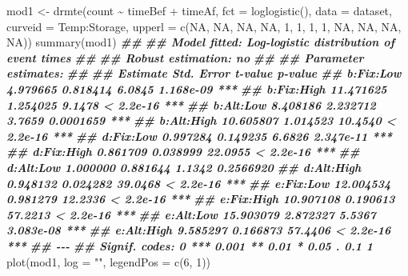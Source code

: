 \documentclass[
]{book}
\newenvironment{Shaded}{\begin{snugshade}}{\end{snugshade}}
\newcommand{\AttributeTok}[1]{\textcolor[rgb]{0.77,0.63,0.00}{#1}}
\newcommand{\ConstantTok}[1]{\textcolor[rgb]{0.00,0.00,0.00}{#1}}
\newcommand{\DecValTok}[1]{\textcolor[rgb]{0.00,0.00,0.81}{#1}}
\newcommand{\DocumentationTok}[1]{\textcolor[rgb]{0.56,0.35,0.01}{\textbf{\textit{#1}}}}
\newcommand{\FunctionTok}[1]{\textcolor[rgb]{0.00,0.00,0.00}{#1}}
\newcommand{\NormalTok}[1]{#1}
\newcommand{\OtherTok}[1]{\textcolor[rgb]{0.56,0.35,0.01}{#1}}
\newcommand{\SpecialCharTok}[1]{\textcolor[rgb]{0.00,0.00,0.00}{#1}}
\newcommand{\StringTok}[1]{\textcolor[rgb]{0.31,0.60,0.02}{#1}}
\begin{document}
\begin{Shaded}
\begin{Highlighting}[]
\NormalTok{mod1 }\OtherTok{\textless{}{-}} \FunctionTok{drmte}\NormalTok{(count }\SpecialCharTok{\textasciitilde{}}\NormalTok{ timeBef }\SpecialCharTok{+}\NormalTok{ timeAf, }\AttributeTok{fct =} \FunctionTok{loglogistic}\NormalTok{(),}
            \AttributeTok{data =}\NormalTok{ dataset, }
            \AttributeTok{curveid =}\NormalTok{ Temp}\SpecialCharTok{:}\NormalTok{Storage,}
            \AttributeTok{upperl =} \FunctionTok{c}\NormalTok{(}\ConstantTok{NA}\NormalTok{, }\ConstantTok{NA}\NormalTok{, }\ConstantTok{NA}\NormalTok{, }\ConstantTok{NA}\NormalTok{, }\DecValTok{1}\NormalTok{, }\DecValTok{1}\NormalTok{, }\DecValTok{1}\NormalTok{, }\DecValTok{1}\NormalTok{, }\ConstantTok{NA}\NormalTok{, }\ConstantTok{NA}\NormalTok{, }\ConstantTok{NA}\NormalTok{, }\ConstantTok{NA}\NormalTok{))}
\FunctionTok{summary}\NormalTok{(mod1)}
\DocumentationTok{\#\# }
\DocumentationTok{\#\# Model fitted: Log{-}logistic distribution of event times}
\DocumentationTok{\#\# }
\DocumentationTok{\#\# Robust estimation: no }
\DocumentationTok{\#\# }
\DocumentationTok{\#\# Parameter estimates:}
\DocumentationTok{\#\# }
\DocumentationTok{\#\#             Estimate Std. Error t{-}value   p{-}value    }
\DocumentationTok{\#\# b:Fix:Low   4.979665   0.818414  6.0845 1.168e{-}09 ***}
\DocumentationTok{\#\# b:Fix:High 11.471625   1.254025  9.1478 \textless{} 2.2e{-}16 ***}
\DocumentationTok{\#\# b:Alt:Low   8.408186   2.232712  3.7659 0.0001659 ***}
\DocumentationTok{\#\# b:Alt:High 10.605807   1.014523 10.4540 \textless{} 2.2e{-}16 ***}
\DocumentationTok{\#\# d:Fix:Low   0.997284   0.149235  6.6826 2.347e{-}11 ***}
\DocumentationTok{\#\# d:Fix:High  0.861709   0.038999 22.0955 \textless{} 2.2e{-}16 ***}
\DocumentationTok{\#\# d:Alt:Low   1.000000   0.881644  1.1342 0.2566920    }
\DocumentationTok{\#\# d:Alt:High  0.948132   0.024282 39.0468 \textless{} 2.2e{-}16 ***}
\DocumentationTok{\#\# e:Fix:Low  12.004534   0.981279 12.2336 \textless{} 2.2e{-}16 ***}
\DocumentationTok{\#\# e:Fix:High 10.907108   0.190613 57.2213 \textless{} 2.2e{-}16 ***}
\DocumentationTok{\#\# e:Alt:Low  15.903079   2.872327  5.5367 3.083e{-}08 ***}
\DocumentationTok{\#\# e:Alt:High  9.585297   0.166873 57.4406 \textless{} 2.2e{-}16 ***}
\DocumentationTok{\#\# {-}{-}{-}}
\DocumentationTok{\#\# Signif. codes:  0 \textquotesingle{}***\textquotesingle{} 0.001 \textquotesingle{}**\textquotesingle{} 0.01 \textquotesingle{}*\textquotesingle{} 0.05 \textquotesingle{}.\textquotesingle{} 0.1 \textquotesingle{} \textquotesingle{} 1}
\FunctionTok{plot}\NormalTok{(mod1, }\AttributeTok{log =} \StringTok{""}\NormalTok{, }\AttributeTok{legendPos =} \FunctionTok{c}\NormalTok{(}\DecValTok{6}\NormalTok{, }\DecValTok{1}\NormalTok{))}
\end{Highlighting}
\end{Shaded}
\end{document}
